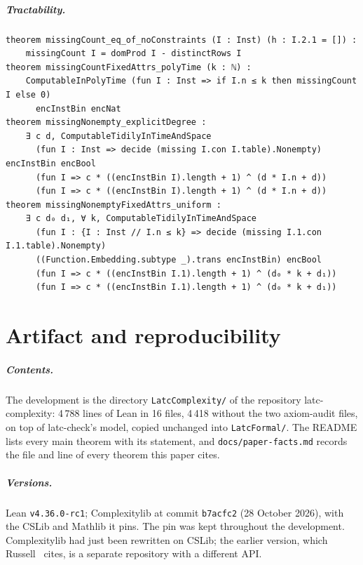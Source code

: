 \documentclass[a4paper,UKenglish,cleveref,autoref,thm-restate]{lipics-v2021}
\begin{document}
\subparagraph*{Tractability.}
\begin{lstlisting}
theorem missingCount_eq_of_noConstraints (I : Inst) (h : I.2.1 = []) :
    missingCount I = domProd I - distinctRows I
theorem missingCountFixedAttrs_polyTime (k : ℕ) :
    ComputableInPolyTime (fun I : Inst => if I.n ≤ k then missingCount I else 0)
      encInstBin encNat
theorem missingNonempty_explicitDegree :
    ∃ c d, ComputableTidilyInTimeAndSpace
      (fun I : Inst => decide (missing I.con I.table).Nonempty) encInstBin encBool
      (fun I => c * ((encInstBin I).length + 1) ^ (d * I.n + d))
      (fun I => c * ((encInstBin I).length + 1) ^ (d * I.n + d))
theorem missingNonemptyFixedAttrs_uniform :
    ∃ c d₀ d₁, ∀ k, ComputableTidilyInTimeAndSpace
      (fun I : {I : Inst // I.n ≤ k} => decide (missing I.1.con I.1.table).Nonempty)
      ((Function.Embedding.subtype _).trans encInstBin) encBool
      (fun I => c * ((encInstBin I.1).length + 1) ^ (d₀ * k + d₁))
      (fun I => c * ((encInstBin I.1).length + 1) ^ (d₀ * k + d₁))
\end{lstlisting}

\section{Artifact and reproducibility}
\label{app:artifact}

\subparagraph*{Contents.}
The development is the directory \texttt{LatcComplexity/} of the repository latc-complexity:
4\,788 lines of Lean in 16 files, 4\,418 without the two axiom-audit files, on top of
latc-check's model, copied unchanged into \texttt{LatcFormal/}. The README lists every main theorem
with its statement, and \texttt{docs/paper-facts.md} records the file and line of every theorem
this paper cites.

\subparagraph*{Versions.}
Lean \texttt{v4.36.0-rc1}; Complexitylib at commit \texttt{b7acfc2} (28 October 2026), with the
CSLib and Mathlib it pins. The pin was kept throughout the development. Complexitylib had just
been rewritten on CSLib; the earlier version, which Russell~\cite{PaperA} cites, is a separate
repository with a different API.
\end{document}

